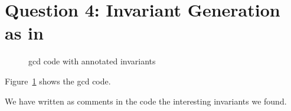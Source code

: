 \section*{Question 4: Invariant Generation as in \cite{Nguyen:2012:UDA}}

\begin{figure}[!ht]
\caption{gcd code with annotated invariants}
\label{fig:gcd}
\end{figure}

Figure~\ref{fig:gcd} shows the gcd code.

We have written as comments in the code the interesting invariants
we found.

